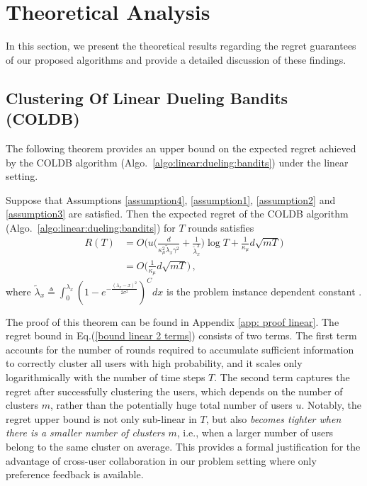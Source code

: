 \section{Theoretical Analysis}
\label{sec:theory}
In this section, we present the theoretical results regarding the regret guarantees of our proposed algorithms and provide a detailed discussion of these findings.
\subsection{Clustering Of Linear Dueling Bandits (COLDB)}
\label{subsec:theory:linear}
The following theorem provides an upper bound on the expected regret achieved by the COLDB algorithm (Algo.~\ref{algo:linear:dueling:bandits}) under the linear setting.
\begin{theorem} \label{thm: linear regret bound}
    Suppose that 
    Assumptions \ref{assumption4}, \ref{assumption1}, \ref{assumption2} and \ref{assumption3}
    are satisfied. Then the expected regret of the COLDB algorithm (Algo.~\ref{algo:linear:dueling:bandits}) for $T$ rounds satisfies
    \begin{align}
        R(T)&= O\Big(u\big(\frac{d}{\kappa_\mu^2\tilde\lambda_x \gamma^2}+\frac{1}{\tilde\lambda_x^2}\big)\log T+\frac{1}{\kappa_\mu}d\sqrt{mT}\Big)\label{bound linear 2 terms}\\
        &=O\Big(\frac{1}{\kappa_\mu}d\sqrt{mT}\Big)\,,
    \end{align}
    where $\tilde{\lambda}_x\triangleq\int_{0}^{\lambda_x} (1-e^{-\frac{(\lambda_x-x)^2}{2\sigma^2}})^{C} dx$ is the problem instance dependent constant \cite{wang2024onlinea,wang2024onlineb}.
\end{theorem}
The proof of this theorem can be found in Appendix \ref{app: proof linear}.
The regret bound in Eq.(\ref{bound linear 2 terms}) consists of two terms. The first term accounts for the number of rounds required to accumulate sufficient information to correctly cluster all users with high probability, and it scales only logarithmically with the number of time steps \(T\). The second term captures the regret after successfully clustering the users, which depends on the number of clusters \(m\), rather than the potentially huge total number of users $u$. 
Notably, the regret upper bound is not only sub-linear in $T$, but also \emph{becomes tighter when there is a smaller number of clusters $m$}, i.e., when a larger number of users belong to the same cluster on average.
This provides a formal justification for the advantage of cross-user collaboration in our problem setting where only preference feedback is available.

